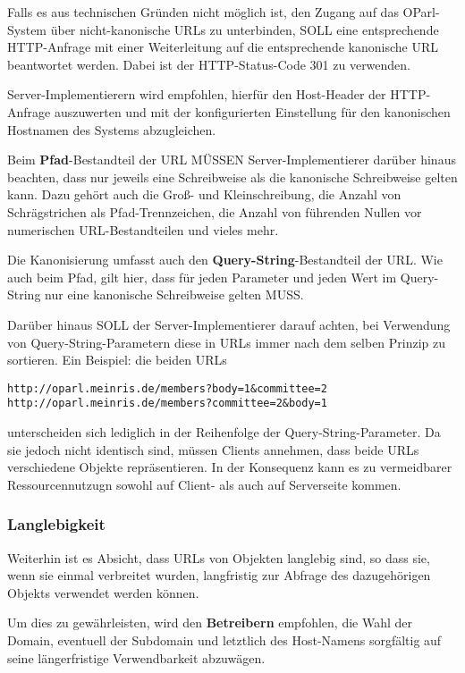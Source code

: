 \documentclass[,a4paper]{article}
\begin{document}
Falls es aus technischen Gründen nicht möglich ist, den Zugang auf das
OParl-System über nicht-kanonische URLs zu unterbinden, SOLL eine
entsprechende HTTP-Anfrage mit einer Weiterleitung auf die entsprechende
kanonische URL beantwortet werden. Dabei ist der HTTP-Status-Code 301 zu
verwenden.

Server-Implementierern wird empfohlen, hierfür den Host-Header der
HTTP-Anfrage auszuwerten und mit der konfigurierten Einstellung für den
kanonischen Hostnamen des Systems abzugleichen.

Beim \textbf{Pfad}-Bestandteil der URL MÜSSEN Server-Implementierer
darüber hinaus beachten, dass nur jeweils eine Schreibweise als die
kanonische Schreibweise gelten kann. Dazu gehört auch die Groß- und
Kleinschreibung, die Anzahl von Schrägstrichen als Pfad-Trennzeichen,
die Anzahl von führenden Nullen vor numerischen URL-Bestandteilen und
vieles mehr.

Die Kanonisierung umfasst auch den \textbf{Query-String}-Bestandteil der
URL. Wie auch beim Pfad, gilt hier, dass für jeden Parameter und jeden
Wert im Query-String nur eine kanonische Schreibweise gelten MUSS.

Darüber hinaus SOLL der Server-Implementierer darauf achten, bei
Verwendung von Query-String-Parametern diese in URLs immer nach dem
selben Prinzip zu sortieren. Ein Beispiel: die beiden URLs

\begin{verbatim}
http://oparl.meinris.de/members?body=1&committee=2
http://oparl.meinris.de/members?committee=2&body=1
\end{verbatim}

unterscheiden sich lediglich in der Reihenfolge der
Query-String-Parameter. Da sie jedoch nicht identisch sind, müssen
Clients annehmen, dass beide URLs verschiedene Objekte repräsentieren.
In der Konsequenz kann es zu vermeidbarer Ressourcennutzugn sowohl auf
Client- als auch auf Serverseite kommen.

\subsubsection{Langlebigkeit}

Weiterhin ist es Absicht, dass URLs von Objekten langlebig sind, so dass
sie, wenn sie einmal verbreitet wurden, langfristig zur Abfrage des
dazugehörigen Objekts verwendet werden können.

Um dies zu gewährleisten, wird den \textbf{Betreibern} empfohlen, die
Wahl der Domain, eventuell der Subdomain und letztlich des Host-Namens
sorgfältig auf seine längerfristige Verwendbarkeit abzuwägen.
\end{document}
